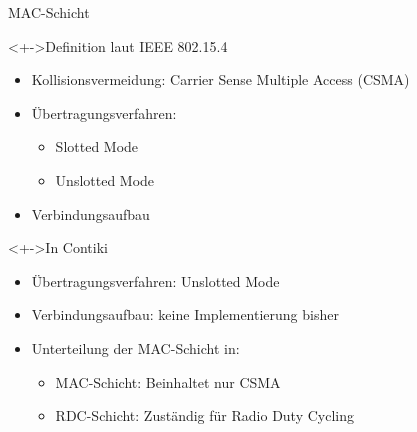 

\begin{frame}{\insertsection}{MAC-Schicht}
	\begin{block}<+->{Definition laut IEEE 802.15.4}
		\begin{itemize}
		\item Kollisionsvermeidung: Carrier Sense Multiple Access (CSMA)
		\item Übertragungsverfahren:
			\begin{itemize}
			\item Slotted Mode
			\item Unslotted Mode
			\end{itemize}
		\item Verbindungsaufbau
		\end{itemize}
	\end{block}





	\begin{block}<+->{In Contiki}
		\begin{itemize}
		\item Übertragungsverfahren: Unslotted Mode
		\item Verbindungsaufbau: keine Implementierung bisher
		\item Unterteilung der MAC-Schicht in:
			\begin{itemize}
				\item MAC-Schicht: Beinhaltet nur CSMA		
				\item RDC-Schicht: Zuständig für Radio Duty Cycling
			\end{itemize}		 
		\end{itemize}
	\end{block}
\end{frame}


